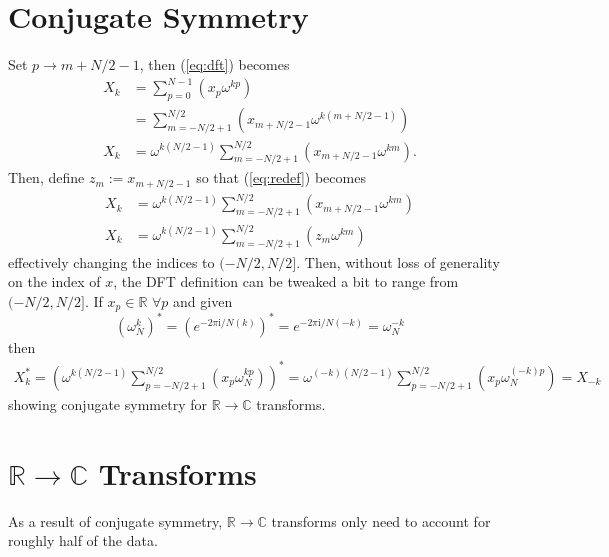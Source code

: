 \documentclass{article}
\begin{document}
\section {Conjugate Symmetry}
%
Set $p \rightarrow m + N/2 - 1$, then (\ref{eq:dft}) becomes
%
\begin {equation} \label {eq:redef}
\begin {aligned}
X_k &= \sum_{p = 0}^{N-1} (x_p \omega^{k p}) \\
    &= \sum_{m = -N/2 + 1}^{N/2} (x_{m + N/2 - 1} \omega^{k (m + N/2 - 1)}) \\
X_k &= \omega^{k (N/2 - 1)} \sum_{m = -N/2 + 1}^{N/2} (x_{m + N/2 - 1} \omega^{k m}).
\end {aligned}
\end {equation}
%
Then, define $z_m := x_{m + N/2 - 1}$ so that (\ref{eq:redef}) becomes
%
\begin {equation}
\begin {aligned}
X_k &= \omega^{k (N/2 - 1)} \sum_{m = -N/2 + 1}^{N/2} (x_{m + N/2 - 1} \omega^{k m}) \\
X_k &= \omega^{k (N/2 - 1)} \sum_{m = -N/2 + 1}^{N/2} (z_m \omega^{k m})
\end {aligned}
\end {equation}
%
effectively changing the indices to $(-N/2, N/2]$.
Then, without loss of generality on the index of $x$, the DFT definition can be tweaked a bit to range from $(-N/2, N/2]$.
If $x_p \in \mathbb {R}$ $\forall p$ and given
%
\begin {equation}
\left (\omega_N^{k} \right)^*
 = \left (e^{-2 \pi \mathrm {i} / N (k)} \right)^* 
 = e^{-2 \pi \mathrm {i} / N (-k)} 
 = \omega_{N}^{-k}
\end {equation}
%
then
%
\begin {equation}
\begin {aligned}
X_k^* = \left( \omega^{k (N/2 - 1)} \sum_{p = -N/2+1}^{N/2} (x_p \omega_N^{k p}) \right)^*
      = \omega^{(-k) (N/2 - 1)} \sum_{p = -N/2+1}^{N/2} (x_p \omega_N^{(-k) p})
      = X_{-k}
\end {aligned}
\end {equation}
%
showing conjugate symmetry for $\mathbb{R} \rightarrow \mathbb{C}$ transforms.

\section {$\mathbb{R} \rightarrow \mathbb{C}$ Transforms}
%
As a result of conjugate symmetry, $\mathbb{R} \rightarrow \mathbb{C}$ transforms only need to account for roughly half of the data.
\end{document}
